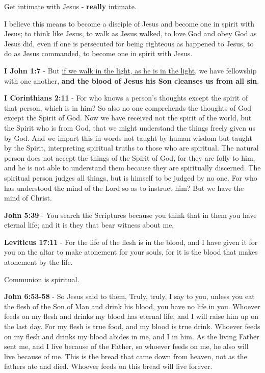 \documentclass[11pt]{article}
\begin{document}
Get intimate with Jesus - \textbf{really} intimate.

I believe this means to become a disciple of Jesus and become one in spirit with Jesus; to think like Jesus, to walk as Jesus walked, to love God and obey God as Jesus did, even if one is persecuted for being righteous as happened to Jesus, to do as Jesus commanded, to become one in spirit with Jesus.

\textbf{I John 1:7} - But \uline{if we walk in the light, as he is in the light}, we have fellowship with one another, \textbf{and the blood of Jesus his Son cleanses us from all sin}.

\textbf{I Corinthians 2:11} - For who knows a person's thoughts except the spirit of that person, which is in him? So also no one comprehends the thoughts of God except the Spirit of God. Now we have received not the spirit of the world, but the Spirit who is from God, that we might understand the things freely given us by God. And we impart this in words not taught by human wisdom but taught by the Spirit, interpreting spiritual truths to those who are spiritual. The natural person does not accept the things of the Spirit of God, for they are folly to him, and he is not able to understand them because they are spiritually discerned. The spiritual person judges all things, but is himself to be judged by no one. For who has understood the mind of the Lord so as to instruct him? But we have the mind of Christ.

\textbf{John 5:39} - You search the Scriptures because you think that in them you have eternal life; and it is they that bear witness about me,

\textbf{Leviticus 17:11} - For the life of the flesh is in the blood, and I have given it for you on the altar to make atonement for your souls, for it is the blood that makes atonement by the life.􃹠

Communion is spiritual.

\textbf{John 6:53-58} - So Jesus said to them, Truly, truly, I say to you, unless you eat the flesh of the Son of Man and drink his blood, you have no life in you.  Whoever feeds on my flesh and drinks my blood has eternal life, and I will raise him up on the last day.  For my flesh is true food, and my blood is true drink.  Whoever feeds on my flesh and drinks my blood abides in me, and I in him.  As the living Father sent me, and I live because of the Father, so whoever feeds on me, he also will live because of me.  This is the bread that came down from heaven, not as the fathers ate and died. Whoever feeds on this bread will live forever.
\end{document}

